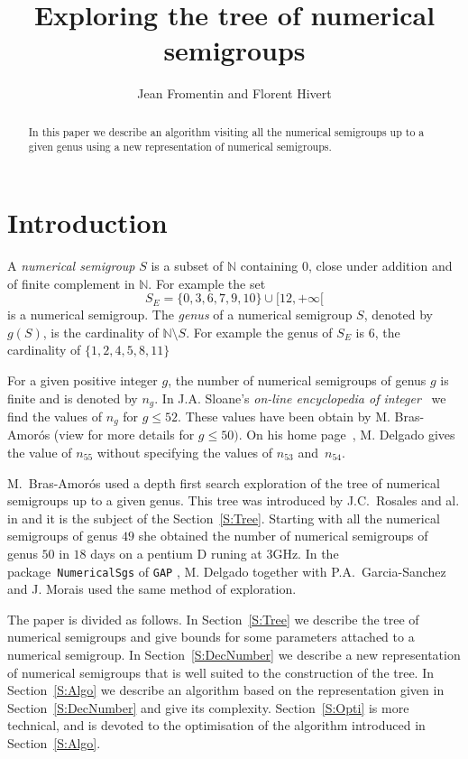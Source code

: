 \documentclass[reqno,11pt]{amsart}
\title{Exploring the tree of numerical semigroups}
\author{Jean Fromentin and  Florent Hivert}
\theoremstyle{plain}
\theoremstyle{definition}
\renewcommand{\leq}{\leqslant}
\newcommand{\NN}{\mathbb{N}}
\renewcommand{\tt}[1]{\texttt{#1}}
\newcommand{\TODO}[1]{\marginpar{\small To do: #1}}
\begin{document}
\begin{abstract}
In this paper we describe an algorithm visiting all the numerical semigroups up to a given genus using a new representation of numerical semigroups. 
\end{abstract}

\maketitle

\section{Introduction}

A \emph{numerical semigroup} $S$ is a subset of $\NN$ containing $0$, close under addition and of finite complement in $\NN$.  
For example the set 
\begin{equation}
\label{E:NSG}
S_E=\{0,3,6,7,9,10\}\cup[12,+\infty[
\end{equation}
is a numerical semigroup.
The \emph{genus} of a numerical semigroup $S$, denoted by~$g(S)$, is the cardinality of $\NN\setminus S$.
 For example the genus of $S_E$ is $6$,  the cardinality of $\{1,2,4,5,8,11\}$

For a given positive integer $g$, the number of numerical semigroups of genus $g$ is finite and is denoted by $n_g$. 
In  J.A. Sloane's \emph{on-line encyclopedia of integer}~\cite{OEIS} we find the values of $n_g$ for $g\leq 52$. 
These values have been obtain by M. Bras-Amor\'os (view \cite{BrasAmoros2008} for more details for $g\leq 50)$. 
On his home page~\cite{Delgado}, M. Delgado  gives the value of $n_{55}$ without specifying the values of $n_{53}$ and~$n_{54}$. 

M.~Bras-Amor\'os used a depth first search exploration of the tree of numerical semigroups up to a given genus.
This tree was introduced by J.C.~Rosales and al. in \cite{Rosales} and it is the subject of the Section~\ref{S:Tree}.
Starting with all the numerical semigroups of genus $49$ she obtained the number of numerical semigroups of genus $50$ in $18$ days on a pentium D runing at $3$GHz. 
In the package~\tt{NumericalSgs} \cite{NumericalSgps} of \tt{GAP} \cite{GAP}, M. Delgado together with P.A.~Garcia-Sanchez and J. Morais used the same method of exploration.

\TODO{Present the goal of the paper.}

The paper is divided as follows.
In Section~\ref{S:Tree} we describe the tree of numerical semigroups and give bounds for some parameters attached to a numerical semigroup.
In Section~\ref{S:DecNumber} we describe a new representation of numerical semigroups that is well suited to the construction of the tree. 
In Section~\ref{S:Algo} we describe an algorithm based on the representation given in Section~\ref{S:DecNumber} and give its complexity. 
Section~\ref{S:Opti} is more technical, and is devoted to the optimisation of the algorithm introduced in Section~\ref{S:Algo}.
\end{document}
